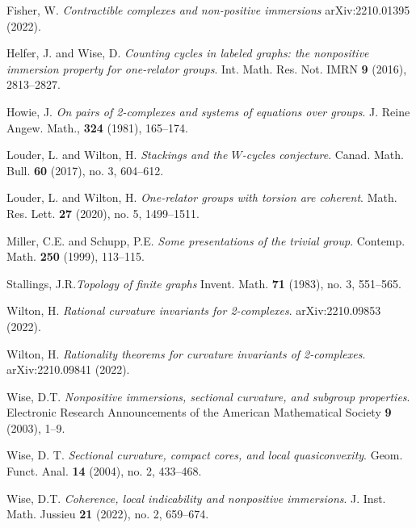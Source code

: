 \documentclass{amsart}
\theoremstyle{plain}
\theoremstyle{definition}
\theoremstyle{remark}
\numberwithin{equation}{section}
\begin{document}
\begin{thebibliography}{99}
 Fisher, W. \textit{Contractible complexes and non-positive immersions} arXiv:2210.01395 (2022).

 Helfer, J. and Wise, D. \textit{Counting cycles in labeled graphs:
the nonpositive immersion property for one-relator groups}. Int. Math.
Res. Not. IMRN \textbf{9} (2016), 2813--2827.

 Howie, J. \textit{On pairs of 2-complexes and systems of equations over groups}. J. Reine Angew. Math., \textbf{324} (1981), 165--174.

 Louder, L. and Wilton, H. \textit{Stackings and the $W$-cycles conjecture}. Canad. Math. Bull. \textbf{60} (2017), no. 3, 604--612.

 Louder, L. and Wilton, H. \textit{One-relator groups with torsion are coherent}. Math. Res. Lett. \textbf{27} (2020), no. 5, 1499--1511.

 Miller, C.E. and Schupp, P.E. \textit{Some presentations of the trivial group}. Contemp. Math. \textbf{250} (1999), 113--115.


 Stallings, J.R.\textit{Topology of finite graphs} Invent. Math. \textbf{71} (1983),
no. 3, 551--565.

 Wilton, H. \textit{Rational curvature invariants for 2-complexes}. arXiv:2210.09853 (2022).

 Wilton, H. \textit{Rationality theorems for curvature invariants of 2-complexes}. arXiv:2210.09841 (2022).

 Wise, D.T. \textit{Nonpositive immersions, sectional curvature, and subgroup properties}. Electronic Research Announcements of the American Mathematical Society \textbf{9} (2003), 1--9.

 Wise, D. T. \textit{Sectional curvature, compact cores, and local quasiconvexity}. Geom. Funct. Anal. \textbf{14} (2004), no. 2, 433--468.

 Wise, D.T. \textit{Coherence, local indicability and nonpositive immersions}. J. Inst. Math. Jussieu \textbf{21} (2022), no. 2, 659--674.

\end{thebibliography}
\end{document}
